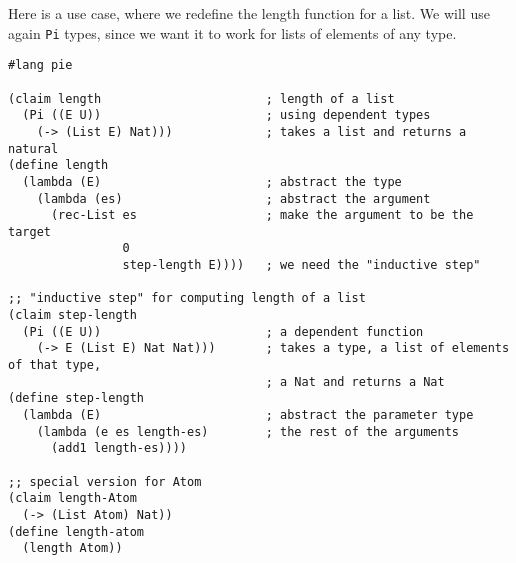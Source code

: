 Here is a use case, where we redefine the length function for a list. We will
use again \texttt{Pi} types, since we want it to work for lists of elements
of any type.
{
  \small
\begin{verbatim}
#lang pie

(claim length                       ; length of a list
  (Pi ((E U))                       ; using dependent types
    (-> (List E) Nat)))             ; takes a list and returns a natural
(define length
  (lambda (E)                       ; abstract the type
    (lambda (es)                    ; abstract the argument
      (rec-List es                  ; make the argument to be the target
                0
                step-length E))))   ; we need the "inductive step"

;; "inductive step" for computing length of a list
(claim step-length
  (Pi ((E U))                       ; a dependent function
    (-> E (List E) Nat Nat)))       ; takes a type, a list of elements of that type,
                                    ; a Nat and returns a Nat
(define step-length
  (lambda (E)                       ; abstract the parameter type
    (lambda (e es length-es)        ; the rest of the arguments
      (add1 length-es))))

;; special version for Atom
(claim length-Atom
  (-> (List Atom) Nat))
(define length-atom
  (length Atom))
\end{verbatim}
}




